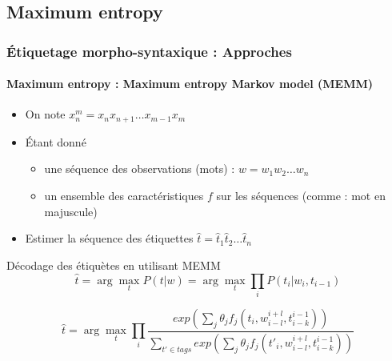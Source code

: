 \documentclass[xcolor=table]{beamer}
\begin{document}
\subsection{Maximum entropy}

\begin{frame}
\frametitle{Étiquetage morpho-syntaxique : Approches}
\framesubtitle{Maximum entropy : Maximum entropy Markov model (MEMM)}

\begin{itemize}
	\item On note $x_{n}^{m} = x_n x_{n+1} \ldots x_{m-1} x_m$
	\item Étant donné 
	\begin{itemize}
		\item une séquence des observations (mots) : $w = w_1 w_2 \ldots w_n$
		\item un ensemble des caractéristiques $f$ sur les séquences (comme : mot en majuscule)
	\end{itemize}
	\item Estimer la séquence des étiquettes $\hat{t} = \hat{t}_1 \hat{t}_2 \ldots \hat{t}_n$
\end{itemize}

\begin{block}{Décodage des étiquètes en utilisant MEMM}
	\[
	\hat{t} = \arg\max\limits_t P(t | w) = \arg\max\limits_t \prod\limits_{i}  P(t_i | w_i, t_{i-1})
	\]
	
	\[
	\hat{t} = \arg\max\limits_t \prod\limits_{i}  
	\frac{exp\left(\sum_j \theta_j f_j(t_i, w_{i-l}^{i+l}, t_{i-k}^{i-1})\right)}%
	{\sum_{t' \in tags} exp\left(\sum_j \theta_j f_j(t'_i, w_{i-l}^{i+l}, t_{i-k}^{i-1})\right)}
	\]

\end{block}

\end{frame}
\end{document}
